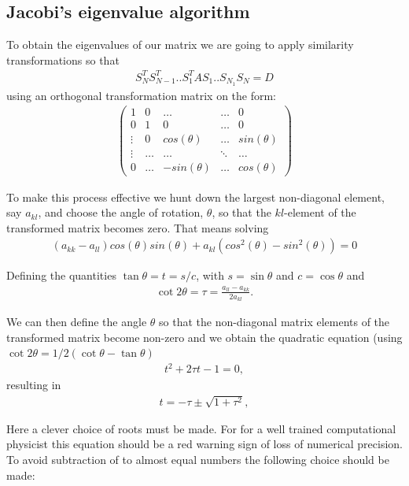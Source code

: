 \documentclass[11pt,a4paper,english,final]{article}
\numberwithin{equation}{section}
\begin{document}
\subsection{Jacobi's eigenvalue algorithm}

To obtain the eigenvalues of our matrix we are going to apply similarity transformations so that
\begin{align*}
S_N^T S_{N-1}^T .. S_1^T A S_1 .. S_{N_1} S_{N} = D
\end{align*}
using an orthogonal transformation matrix on the form:
\begin{align*}
\begin{pmatrix} 1 & 0 & \dots   & \dots    & 0     \\
                0 & 1 & 0 & \dots    & 0   \\
                \vdots & 0 & cos(\theta) & \dots  & sin(\theta)        \\
        \vdots  & \dots & \dots & \ddots   &\dots \\
 0   & \dots & -sin(\theta) & \dots  & cos(\theta)  
             \end{pmatrix}
\end{align*}

To make this process effective we hunt down the largest non-diagonal element, say $a_{kl}$, and choose the angle of rotation, $\theta$, so that the $kl$-element of the transformed matrix becomes zero. That means solving
\begin{align*}
(a_{kk}-a_{ll})cos(\theta)sin(\theta)+a_{kl}(cos^2 (\theta) - sin^2 (\theta)) = 0
\end{align*}

Defining the quantities $\tan\theta = t= s/c$, with $s=\sin\theta$ and $c=\cos\theta$ and
\begin{gather}\cot 2\theta=\tau = \frac{a_{ll}-a_{kk}}{2a_{kl}}.
\end{gather}

We can then define the angle $\theta$ so that the non-diagonal matrix elements of the transformed matrix 
 become non-zero and
we obtain the quadratic equation (using $\cot 2\theta=1/2(\cot \theta-\tan\theta)$
\begin{gather}
t^2+2\tau t-1= 0,
\end{gather}
resulting in 
\begin{gather}
  t = -\tau \pm \sqrt{1+\tau^2},
\end{gather}

Here a clever choice of roots must be made. For for a well trained computational physicist this equation should be a red warning sign of loss of numerical precision. To avoid subtraction of to almost equal numbers the following choice should be made:
\end{document}
